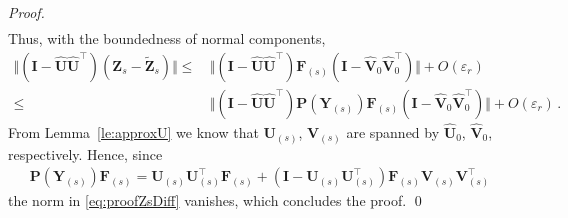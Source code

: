 \documentclass[preprint,runningheads]{svjour3}
\def\wh{\widehat}
\newcommand\bfI{{\mathbf I}}
\newcommand\bfF{{\mathbf F}}
\newcommand\bfP{{\mathbf P}}
\newcommand\bfU{{\mathbf U}}
\newcommand\bfV{{\mathbf V}}
\newcommand\bfY{{\mathbf Y}}
\newcommand\bfZ{{\mathbf Z}}
\begin{document}
\begin{proof}
\begin{align*}
\end{align*}
Thus, with the boundedness of normal components,
\begin{align}\label{eq:proofZsDiff}
    \Vert (\bfI-\wh \bfU\wh \bfU^{\top})(\bfZ_s - \widetilde \bfZ_s) \Vert \leq\,& \Vert (\bfI-\wh \bfU\wh \bfU^{\top})\bfF_{(s)}(\bfI - \wh \bfV_0\wh \bfV_0^{\top} ) \Vert + O(\varepsilon_r)\nonumber\\
    \leq\,& \Vert (\bfI-\wh \bfU\wh \bfU^{\top})\bfP(\bfY_{(s)})\bfF_{(s)}(\bfI - \wh \bfV_0\wh \bfV_0^{\top} ) \Vert + O(\varepsilon_r)\,.
\end{align}
From Lemma~\ref{le:approxU} we know that $\bfU_{(s)}$, $\bfV_{(s)}$ are spanned by $\wh \bfU_0$, $\wh\bfV_0$, respectively. Hence, since
\begin{align*}
    \bfP(\bfY_{(s)})\bfF_{(s)} = \bfU_{(s)}\bfU_{(s)}^{\top}\bfF_{(s)} + (\bfI - \bfU_{(s)}\bfU_{(s)}^{\top})\bfF_{(s)}\bfV_{(s)}\bfV_{(s)}^{\top}
\end{align*}
the norm in \eqref{eq:proofZsDiff} vanishes, which concludes the proof. \qed
\end{proof}
\end{document}
